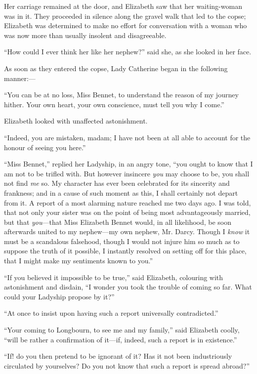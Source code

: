 Her carriage remained at the door, and Elizabeth saw that her waiting-woman was in it. They proceeded in silence along the gravel walk that led to the copse; Elizabeth was determined to make no effort for conversation with a woman who was now more than usually insolent and disagreeable.



``How could I ever think her like her nephew?'' said she, as she looked in her face.

As soon as they entered the copse, Lady Catherine began in the following manner:---

``You can be at no loss, Miss Bennet, to understand the reason of my journey hither. Your own heart, your own conscience, must tell you why I come.''

Elizabeth looked with unaffected astonishment.

``Indeed, you are mistaken, madam; I have not been at all able to account for the honour of seeing you here.''

``Miss Bennet,'' replied her Ladyship, in an angry tone, ``you ought to know that I am not to be trifled with. But however insincere \textit{you} may choose to be, you shall not find \textit{me} so. My character has ever been celebrated for its sincerity and frankness; and in a cause of such moment as this, I shall certainly not depart from it. A report of a most alarming nature reached me two days ago. I was told, that not only your sister was on the point of being most advantageously married, but that \textit{you}---that Miss Elizabeth Bennet would, in all likelihood, be soon afterwards united to my nephew---my own nephew, Mr. Darcy. Though I \textit{know} it must be a scandalous falsehood, though I would not injure him so much as to suppose the truth of it possible, I instantly resolved on setting off for this place, that I might make my sentiments known to you.''

``If you believed it impossible to be true,'' said Elizabeth, colouring with astonishment and disdain, ``I wonder you took the trouble of coming so far. What could your Ladyship propose by it?''

``At once to insist upon having such a report universally contradicted.''

``Your coming to Longbourn, to see me and my family,'' said Elizabeth coolly, ``will be rather a confirmation of it---if, indeed, such a report is in existence.''

``If! do you then pretend to be ignorant of it? Has it not been industriously circulated by yourselves? Do you not know that such a report is spread abroad?''

